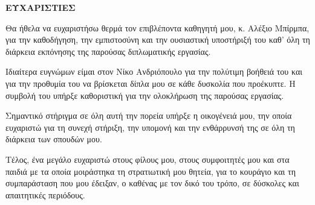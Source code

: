 \begin{center}
\Large{\textbf{ΕΥΧΑΡΙΣΤΙΕΣ}}
\end{center}
\vspace{3pt}

Θα ήθελα να ευχαριστήσω θερμά τον επιβλέποντα καθηγητή μου, κ. Αλέξιο Μπίρμπα, για την καθοδήγηση, την εμπιστοσύνη και την ουσιαστική υποστήριξή του καθ' όλη τη διάρκεια εκπόνησης της παρούσας διπλωματικής εργασίας.

Ιδιαίτερα ευγνώμων είμαι στον Νίκο Ανδριόπουλο για την πολύτιμη βοήθειά του και για την προθυμία του να βρίσκεται δίπλα μου σε κάθε δυσκολία που προέκυπτε. Η συμβολή του υπήρξε καθοριστική για την ολοκλήρωση της παρούσας εργασίας.

Σημαντικό στήριγμα σε όλη αυτή την πορεία υπήρξε η οικογένειά μου, την οποία ευχαριστώ για τη συνεχή στήριξη, την υπομονή και την ενθάρρυνσή της σε όλη τη διάρκεια των σπουδών μου.

Τέλος, ένα μεγάλο ευχαριστώ στους φίλους μου, στους συμφοιτητές μου και στα παιδιά με τα οποία μοιράστηκα τη στρατιωτική μου θητεία, για το κουράγιο και τη συμπαράσταση που μου έδειξαν, ο καθένας με τον δικό του τρόπο, σε δύσκολες και απαιτητικές περιόδους.
